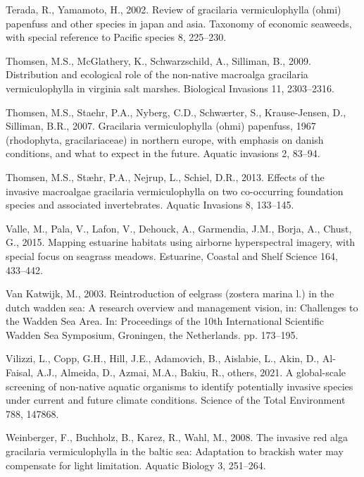 \documentclass[
  letterpaper,
  DIV=11,
  numbers=noendperiod]{scrartcl}
\newlength{\cslhangindent}
\newenvironment{CSLReferences}[2] %
 {\begin{list}{}{%
  \setlength{\itemindent}{0pt}
  \setlength{\leftmargin}{0pt}
  \setlength{\parsep}{0pt}
  \ifodd #1
   \setlength{\leftmargin}{\cslhangindent}
   \setlength{\itemindent}{-1\cslhangindent}
  \fi
  \setlength{\itemsep}{#2\baselineskip}}}
 {\end{list}}
\begin{document}
\begin{CSLReferences}{1}{0}
Terada, R., Yamamoto, H., 2002. Review of gracilaria vermiculophylla
(ohmi) papenfuss and other species in japan and asia. Taxonomy of
economic seaweeds, with special reference to Pacific species 8,
225--230.

Thomsen, M.S., McGlathery, K., Schwarzschild, A., Silliman, B., 2009.
Distribution and ecological role of the non-native macroalga gracilaria
vermiculophylla in virginia salt marshes. Biological Invasions 11,
2303--2316.

Thomsen, M.S., Staehr, P.A., Nyberg, C.D., Schwærter, S., Krause-Jensen,
D., Silliman, B.R., 2007. Gracilaria vermiculophylla (ohmi) papenfuss,
1967 (rhodophyta, gracilariaceae) in northern europe, with emphasis on
danish conditions, and what to expect in the future. Aquatic invasions
2, 83--94.

Thomsen, M.S., Stæhr, P.A., Nejrup, L., Schiel, D.R., 2013. Effects of
the invasive macroalgae gracilaria vermiculophylla on two co-occurring
foundation species and associated invertebrates. Aquatic Invasions 8,
133--145.

Valle, M., Pala, V., Lafon, V., Dehouck, A., Garmendia, J.M., Borja, A.,
Chust, G., 2015. Mapping estuarine habitats using airborne hyperspectral
imagery, with special focus on seagrass meadows. Estuarine, Coastal and
Shelf Science 164, 433--442.

Van Katwijk, M., 2003. Reintroduction of eelgrass (zostera marina l.) in
the dutch wadden sea: A research overview and management vision, in:
Challenges to the Wadden Sea Area. In: Proceedings of the 10th
International Scientific Wadden Sea Symposium, Groningen, the
Netherlands. pp. 173--195.

Vilizzi, L., Copp, G.H., Hill, J.E., Adamovich, B., Aislabie, L., Akin,
D., Al-Faisal, A.J., Almeida, D., Azmai, M.A., Bakiu, R., others, 2021.
A global-scale screening of non-native aquatic organisms to identify
potentially invasive species under current and future climate
conditions. Science of the Total Environment 788, 147868.

Weinberger, F., Buchholz, B., Karez, R., Wahl, M., 2008. The invasive
red alga gracilaria vermiculophylla in the baltic sea: Adaptation to
brackish water may compensate for light limitation. Aquatic Biology 3,
251--264.


\end{CSLReferences}
\end{document}
